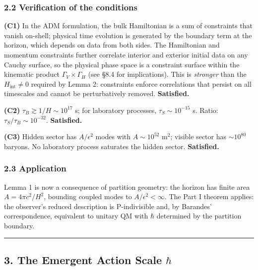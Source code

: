 \documentclass[
]{article}
\begin{document}
\hypertarget{verification-of-the-conditions}{%
\subsubsection{2.2 Verification of the
conditions}\label{verification-of-the-conditions}}

\textbf{(C1)} In the ADM formulation, the bulk Hamiltonian is a sum of
constraints that vanish on-shell; physical time evolution is generated
by the boundary term at the horizon, which depends on data from both
sides. The Hamiltonian and momentum constraints further correlate
interior and exterior initial data on any Cauchy surface, so the
physical phase space is a constraint surface within the kinematic
product \(\Gamma_V \times \Gamma_H\) (see §8.4 for implications). This
is \emph{stronger} than the \(H_{\text{int}} \neq 0\) required by Lemma
2: constraints enforce correlations that persist on all timescales and
cannot be perturbatively removed. \textbf{Satisfied.}

\textbf{(C2)} \(\tau_B \gtrsim 1/H \sim 10^{17}\) s; for laboratory
processes, \(\tau_S \sim 10^{-15}\) s. Ratio:
\(\tau_S / \tau_B \sim 10^{-32}\). \textbf{Satisfied.}

\textbf{(C3)} Hidden sector has \(A/\epsilon^2\) modes with
\(A \sim 10^{52}\) m\(^2\); visible sector has \(\sim 10^{80}\) baryons.
No laboratory process saturates the hidden sector. \textbf{Satisfied.}

\hypertarget{application}{%
\subsubsection{2.3 Application}\label{application}}

Lemma 1 is now a consequence of partition geometry: the horizon has
finite area \(A = 4\pi c^2/H^2\), bounding coupled modes to
\(A/\epsilon^2 < \infty\). The Part I theorem applies: the observer's
reduced description is P-indivisible and, by Barandes' correspondence,
equivalent to unitary QM with \(\hbar\) determined by the partition
boundary.

\begin{center}\rule{0.5\linewidth}{0.5pt}\end{center}

\hypertarget{the-emergent-action-scale-hbar}{%
\subsection{\texorpdfstring{3. The Emergent Action Scale
\(\hbar\)}{3. The Emergent Action Scale \textbackslash hbar}}\label{the-emergent-action-scale-hbar}}
\end{document}
